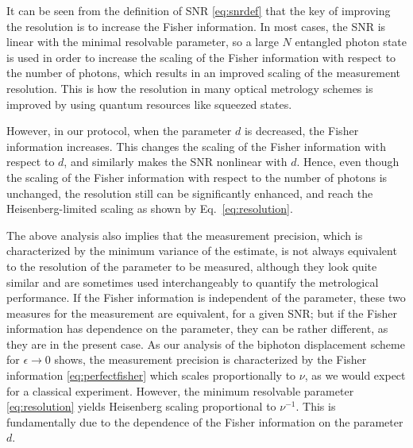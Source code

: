 It can be seen from the definition of SNR \eqref{eq:snrdef} that the key of improving the resolution is to increase the Fisher information. 
In most cases, the SNR is linear with the minimal resolvable parameter, so a large $N$ entangled photon state is used in order to increase the scaling of the Fisher information with respect to the number of photons, which results in an improved scaling of the measurement resolution. 
This is how the resolution in many optical metrology schemes is improved by using quantum resources like squeezed states.

However, in our protocol, when the parameter $d$ is decreased, the Fisher information increases. 
This changes the scaling of the Fisher information with respect to $d$, and similarly makes the SNR nonlinear with $d$. 
Hence, even though the scaling of the Fisher information with respect to the number of photons is unchanged, the resolution still can be significantly enhanced, and reach the Heisenberg-limited scaling as shown by Eq.~\eqref{eq:resolution}.

The above analysis also implies that the measurement precision, which is characterized by the minimum variance of the estimate, is not always equivalent to the resolution of the parameter to be measured, although they look quite similar and are sometimes used interchangeably to quantify the metrological performance. 
If the Fisher information is independent of the parameter, these two measures for the measurement are equivalent, for a given SNR; but if the Fisher information has dependence on the parameter, they can be rather different, as they are in the present case.
As our analysis of the biphoton displacement scheme for $\epsilon \rightarrow 0$ shows, the measurement precision is characterized by the Fisher information \eqref{eq:perfectfisher} which scales proportionally to $\nu$, as we would expect for a classical experiment.
However, the minimum resolvable parameter \eqref{eq:resolution} yields Heisenberg scaling proportional to $\nu^{-1}$.  
This is fundamentally due to the dependence of the Fisher information on the parameter $d$. 

